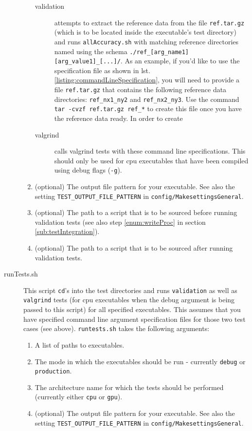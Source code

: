 \begin{description}
\begin{enumerate}
    \begin{description}
     \item [validation] attempts to extract the reference data from the file \verb|ref.tar.gz| (which is to be located inside the executable's test directory) and runs \verb|allAccuracy.sh| with matching reference directories named using the schema \verb|./ref_[arg_name1][arg_value1]_[...]/|. As an example, if you'd like to use the specification file as shown in lst. \ref{listing:commandLineSpecification}, you will need to provide a file \verb|ref.tar.gz| that contains the following reference data directories: \verb|ref_nx1_ny2| and \verb|ref_nx2_ny3|. Use the command \verb|tar -cvzf ref.tar.gz ref_*| to create this file once you have the reference data ready. In order to create
     \item [valgrind] calls valgrind tests with these command line specifications. This should only be used for cpu executables that have been compiled using debug flags (\verb|-g|).
    \end{description}
   \item (optional) The output file pattern for your executable. See also the setting \verb|TEST_OUTPUT_FILE_PATTERN| in \verb|config/MakesettingsGeneral|.
   \item (optional) The path to a script that is to be sourced before running validation tests (see also step \ref{enum:writeProc} in section \ref{sub:testIntegration}).
   \item (optional) The path to a script that is to be sourced after running validation tests.
  \end{enumerate}
 \item [runTests.sh] This script \verb|cd|'s into the test directories and runs \verb|validation| as well as \verb|valgrind| tests (for cpu executables when the debug argument is being passed to this script) for all specified executables. This assumes that you have specified command line argument specification files for those two test cases (see above). \verb|runtests.sh| takes the following arguments:
  \begin{enumerate}
   \item A list of paths to executables.
   \item The mode in which the executables should be run - currently \verb|debug| or \verb|production|.
   \item The architecture name for which the tests should be performed (currently either \verb|cpu| or \verb|gpu|).
   \item (optional) The output file pattern for your executable. See also the setting \verb|TEST_OUTPUT_FILE_PATTERN| in \verb|config/MakesettingsGeneral|.

\end{enumerate}
\end{description}
